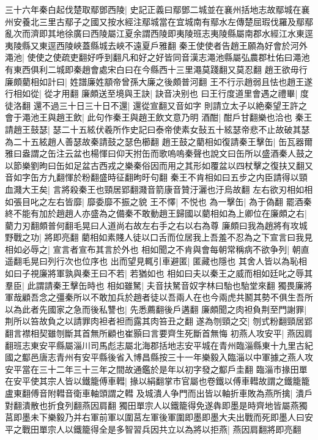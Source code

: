 三十六年秦白起伐楚取鄢鄧西陵|{
	史記正義曰鄢鄧二城並在襄州括地志故鄢城在襄州安養北三里古鄢子之國又按水經注鄢城當在宜城南有鄢水左傳楚屈瑕伐羅及鄢鄢亂次而濟即其地徐廣曰西陵屬江夏余謂西陵即夷陵班志夷陵縣屬南郡水經江水東逕夷陵縣又東逕西陵峽蓋縣城去峽不遠夏戶雅翻}
秦王使使者告趙王願為好會於河外澠池|{
	使使之使疏吏翻好呼到翻凡和好之好皆同音漢志澠池縣屬弘農郡杜佑曰澠池有東西俱利二城即秦趙會處宋白曰在今縣西十三里澠莫踐翻又莫忍翻}
趙王欲毋行廉頗藺相如計曰|{
	姓譜廉姓顓帝曾孫大廉之後頗普河翻}
王不行示趙弱且怯也趙王遂行相如從|{
	從才用翻}
廉頗送至境與王訣|{
	訣音决别也}
曰王行度道里會遇之禮畢|{
	度徒洛翻}
還不過三十日三十日不還|{
	還從宣翻又音如字}
則請立太子以絶秦望王許之會于澠池王與趙王飲|{
	此句作秦王與趙王飲文意乃明}
酒酣|{
	酣戶甘翻樂也洽也}
秦王請趙王鼓瑟|{
	瑟二十五絃伏羲所作史記曰泰帝使素女鼔五十絃瑟帝悲不止故破其瑟為二十五絃趙人善瑟故秦請鼓之瑟色櫛翻}
趙王鼓之藺相如復請秦王擊缶|{
	缶瓦器爾雅曰盎謂之缶注云盆也楊惲曰仰天拊缶而歌嗚嗚秦聲也說文曰缶所以盛酒秦人鼓之以節樂劉昫曰缶如足盆古西戎之樂秦俗因而用之其形如覆盆以四杖擊之復扶又翻又音如字缶方九翻惲於粉翻盛時征翻昫旴句翻}
秦王不肯相如曰五步之内臣請得以頸血濺大王矣|{
	言將殺秦王也頸居郢翻濺音箭康音贊汙灑也汙烏故翻}
左右欲刃相如相如張目叱之左右皆靡|{
	靡委靡不振之貌}
王不懌|{
	不悦也}
為一擊缶|{
	為于偽翻}
罷酒秦終不能有加於趙趙人亦盛為之備秦不敢動趙王歸國以藺相如為上卿位在廉頗之右|{
	藺力刃翻頗普何翻毛晃曰人道尚右故左右手之右以右為尊}
廉頗曰我為趙將有攻城野戰之功|{
	將即亮翻}
藺相如素賤人徒以口舌而位居我上吾羞不忍為之下宣言曰我見相如必辱之|{
	宣言者宣布其言於外也}
相如聞之不肯與會每朝常稱病不欲争列|{
	朝直遥翻毛晃曰列行次也位序也}
出而望見輒引車避匿|{
	匿藏也隱也}
其舍人皆以為恥相如曰子視廉將軍孰與秦王曰不若|{
	若猶如也}
相如曰夫以秦王之威而相如廷叱之辱其羣臣|{
	此謂請秦王擊缶時也}
相如雖駑|{
	夫音扶駑音奴字林曰駘也駘堂來翻}
獨畏廉將軍哉顧吾念之彊秦所以不敢加兵於趙者徒以吾兩人在也今兩虎共鬭其勢不俱生吾所以為此者先國家之急而後私讐也|{
	先悉薦翻後戶遘翻}
廉頗聞之肉袒負荆至門謝罪|{
	荆所以笞故負之以請罪肉袒者袒而露其肉笞丑之翻}
遂為刎頸之交|{
	刎式粉翻頸居郢翻言襟相契雖刎斷其首無所顧也崔顥曰言要齊生死斷首無悔}
初燕人攻安平|{
	燕因肩翻班志東安平縣屬淄川司馬彪志屬北海郡括地志安平城在青州臨淄縣東十九里古紀國之酅邑唐志青州有安平縣後省入博昌縣按三十一年樂毅入臨淄以中軍據之燕人攻安平當在三十二年三十三年之間故通鑑於是年以初字發之酅戶圭翻}
臨淄市掾田單在安平使其宗人皆以鐵籠傅車轊|{
	掾以絹翻掌市官屬也卷鐵以傅車轊故謂之鐵籠籠盧東翻傅音附轊音衛車軸頭謂之轊}
及城潰人争門而出皆以軸折車敗為燕所擒|{
	潰戶對翻潰散也折食列翻燕因肩翻}
獨田單宗人以鐵籠得免遂犇即墨是時齊地皆屬燕獨莒即墨未下樂毅乃并右軍前軍以圍莒左軍後軍圍即墨即墨大夫出戰而死即墨人曰安平之戰田單宗人以鐵籠得全是多智習兵因共立以為將以拒燕|{
	燕因肩翻將即亮翻}
